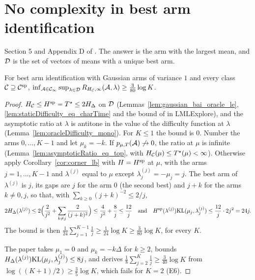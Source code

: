 \chapter{No complexity in best arm identification}
\label{chap:bai}

Section 5 and Appendix D of \cite{D23}. The answer is the arm with the largest mean, and $\mathcal{D}$ is
the set of vectors of means with a unique best arm.

\begin{theorem}[{\cite[Theorem 8]{D23}}]
  \label{thm:gaussian_bai_no_complexity}
  \leanok
  For best arm identification with Gaussian arms of variance $1$ and every class $\mathcal{C} \supseteq
  \mathcal{C}^{\mathrm{sp}}$, $\inf_{\mathcal{A} \in \mathcal{C}_{\infty}} \sup_{\lambda \in \mathcal{D}} R_{H_{\mathcal{C}}, \infty}(\mathcal{A}, \lambda) \ge
  \frac{3}{80} \log K$.
\end{theorem}

\begin{proof}
  \leanok
  $H_{\mathcal{C}} \le H^{\mathrm{sp}} = T^{\star} \le 2 H_{\Delta}$ on $\mathcal{D}$
  (Lemmas~\ref{lem:gaussian_bai_oracle_le}, \ref{lem:staticDifficulty_eq_charTime} and the
  bound of \cite{GK16} in LMLExplore), and the asymptotic ratio at $\lambda$ is antitone in the
  value of the difficulty function at $\lambda$ (Lemma~\ref{lem:oracleDifficulty_mono}). For
  $K \le 1$ the bound is $0$. Number the arms $0, \dots, K - 1$ and let $\mu_k = -k$. If
  $p_{\mu,T}(\mathcal{A}) \not\to 0$, the ratio at $\mu$ is infinite
  (Lemma~\ref{lem:asymptoticRatio_eq_top}, with $H_{\mathcal{C}}(\mu) \le T^{\star}(\mu) < \infty$).
  Otherwise apply Corollary~\ref{cor:corner_lb} with $H = H^{\mathrm{sp}}$ at $\mu$, with the arms $j = 1,
  \dots, K - 1$ and $\lambda^{(j)}$ equal to $\mu$ except $\lambda^{(j)}_j = -\mu_j = j$. The best
  arm of $\lambda^{(j)}$ is $j$, its gaps are $j$ for the arm $0$ (the second best) and $j + k$
  for the arms $k \ne 0, j$, so that, with $\sum_{k \ge 0} (j + k)^{-2} \le 2 / j$,
  \[ 2 H_{\Delta}(\lambda^{(j)}) \le 2 \Bigl(\frac{2}{j^2} + \sum_{k \ne j} \frac{2}{(j + k)^2}
    \Bigr) \le \frac{4}{j^2} + \frac{8}{j} \le \frac{12}{j} \quad \text{and} \quad
    H^{\mathrm{sp}}(\lambda^{(j)}) \mathrm{KL}(\mu_j, \lambda^{(j)}_j) \le \frac{12}{j} \cdot 2 j^2 = 24 j. \]
  The bound is then $\frac{1}{24} \sum_{j=1}^{K-1} \frac1j \ge \frac{1}{24} \log K \ge
  \frac{3}{80} \log K$, for every $K$.

  The paper takes $\mu_1 = 0$ and $\mu_k = -k \Delta$ for $k \ge 2$, bounds
  $H_{\Delta}(\lambda^{(j)}) \mathrm{KL}(\mu_j, \lambda^{(j)}_j) \le 8 j$, and derives
  $\frac18 \sum_{j=2}^K \frac1j \ge \frac{3}{40} \log K$ from $\log((K + 1) / 2) \ge \frac35 \log
  K$, which fails for $K = 2$ (E6).
\end{proof}

